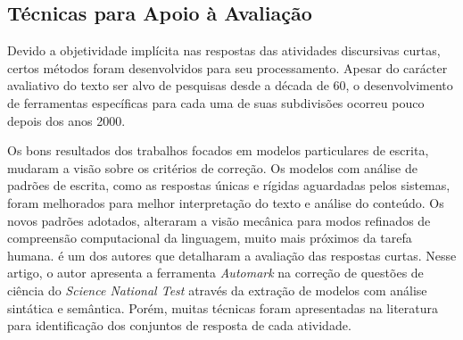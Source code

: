 \subsection{Técnicas para Apoio à Avaliação}
Devido a objetividade implícita nas respostas das atividades discursivas curtas, certos métodos foram desenvolvidos para seu processamento. Apesar do carácter avaliativo do texto ser alvo de pesquisas desde a década de 60, o desenvolvimento de ferramentas específicas para cada uma de suas subdivisões ocorreu pouco depois dos anos 2000.

Os bons resultados dos trabalhos focados em modelos particulares de escrita, mudaram a visão sobre os critérios de correção. Os modelos com análise de padrões de escrita, como as respostas únicas e rígidas aguardadas pelos sistemas, foram melhorados para melhor interpretação do texto e análise do conteúdo. Os novos padrões adotados, alteraram a visão mecânica para modos refinados de compreensão computacional da linguagem, muito mais próximos da tarefa humana.  é um dos autores que detalharam a avaliação das respostas curtas. Nesse artigo, o autor apresenta a ferramenta \textit{Automark} na correção de questões de ciência do \textit{Science National Test} através da extração de modelos com análise sintática e semântica. Porém, muitas técnicas foram apresentadas na literatura para identificação dos conjuntos de resposta de cada atividade.


